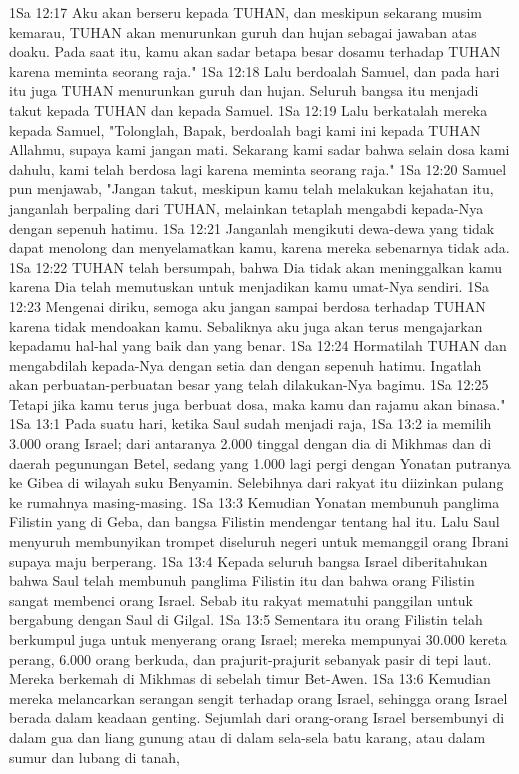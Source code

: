 1Sa 12:17  Aku akan berseru kepada TUHAN, dan meskipun sekarang musim kemarau, TUHAN akan menurunkan guruh dan hujan sebagai jawaban atas doaku. Pada saat itu, kamu akan sadar betapa besar dosamu terhadap TUHAN karena meminta seorang raja."
1Sa 12:18  Lalu berdoalah Samuel, dan pada hari itu juga TUHAN menurunkan guruh dan hujan. Seluruh bangsa itu menjadi takut kepada TUHAN dan kepada Samuel.
1Sa 12:19  Lalu berkatalah mereka kepada Samuel, "Tolonglah, Bapak, berdoalah bagi kami ini kepada TUHAN Allahmu, supaya kami jangan mati. Sekarang kami sadar bahwa selain dosa kami dahulu, kami telah berdosa lagi karena meminta seorang raja."
1Sa 12:20  Samuel pun menjawab, "Jangan takut, meskipun kamu telah melakukan kejahatan itu, janganlah berpaling dari TUHAN, melainkan tetaplah mengabdi kepada-Nya dengan sepenuh hatimu.
1Sa 12:21  Janganlah mengikuti dewa-dewa yang tidak dapat menolong dan menyelamatkan kamu, karena mereka sebenarnya tidak ada.
1Sa 12:22  TUHAN telah bersumpah, bahwa Dia tidak akan meninggalkan kamu karena Dia telah memutuskan untuk menjadikan kamu umat-Nya sendiri.
1Sa 12:23  Mengenai diriku, semoga aku jangan sampai berdosa terhadap TUHAN karena tidak mendoakan kamu. Sebaliknya aku juga akan terus mengajarkan kepadamu hal-hal yang baik dan yang benar.
1Sa 12:24  Hormatilah TUHAN dan mengabdilah kepada-Nya dengan setia dan dengan sepenuh hatimu. Ingatlah akan perbuatan-perbuatan besar yang telah dilakukan-Nya bagimu.
1Sa 12:25  Tetapi jika kamu terus juga berbuat dosa, maka kamu dan rajamu akan binasa."
1Sa 13:1  Pada suatu hari, ketika Saul sudah menjadi raja,
1Sa 13:2  ia memilih 3.000 orang Israel; dari antaranya 2.000 tinggal dengan dia di Mikhmas dan di daerah pegunungan Betel, sedang yang 1.000 lagi pergi dengan Yonatan putranya ke Gibea di wilayah suku Benyamin. Selebihnya dari rakyat itu diizinkan pulang ke rumahnya masing-masing.
1Sa 13:3  Kemudian Yonatan membunuh panglima Filistin yang di Geba, dan bangsa Filistin mendengar tentang hal itu. Lalu Saul menyuruh membunyikan trompet diseluruh negeri untuk memanggil orang Ibrani supaya maju berperang.
1Sa 13:4  Kepada seluruh bangsa Israel diberitahukan bahwa Saul telah membunuh panglima Filistin itu dan bahwa orang Filistin sangat membenci orang Israel. Sebab itu rakyat mematuhi panggilan untuk bergabung dengan Saul di Gilgal.
1Sa 13:5  Sementara itu orang Filistin telah berkumpul juga untuk menyerang orang Israel; mereka mempunyai 30.000 kereta perang, 6.000 orang berkuda, dan prajurit-prajurit sebanyak pasir di tepi laut. Mereka berkemah di Mikhmas di sebelah timur Bet-Awen.
1Sa 13:6  Kemudian mereka melancarkan serangan sengit terhadap orang Israel, sehingga orang Israel berada dalam keadaan genting. Sejumlah dari orang-orang Israel bersembunyi di dalam gua dan liang gunung atau di dalam sela-sela batu karang, atau dalam sumur dan lubang di tanah,
